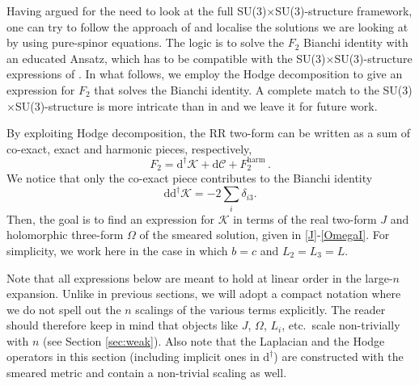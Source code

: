 \documentclass[11pt]{article}
\newcommand{\be}{\begin{equation}}
\newcommand{\ee}{\end{equation}}
\def\be{\begin{equation}}
\def\ee{\end{equation}}
\renewcommand{\[}{\left[}
\renewcommand{\]}{\right]}
\renewcommand{\(}{\left(}
\renewcommand{\)}{\right)}
\renewcommand{\d}{\textrm{d}}
\newcommand{\dd}{\mathrm{d}}
\newcommand{\<}{\langle}
\renewcommand{\>}{\rangle}
\begin{document}
Having argued for the need to look at the full SU(3)$\times$SU(3)-structure framework, one can try to follow the approach of \cite{Marchesano:2020qvg} and localise the solutions we are looking at by using pure-spinor equations. The logic is to solve the $F_2$ Bianchi identity with an educated Ansatz, which has to be compatible with the SU(3)$\times$SU(3)-structure expressions of \cite{Saracco:2012wc}. In what follows, we employ the Hodge decomposition to give an expression for $F_2$ that solves the Bianchi identity. A complete match to the SU(3)$\times$SU(3)-structure is more intricate than in \cite{Marchesano:2020qvg} and we leave it for future work.

By exploiting Hodge decomposition, the RR two-form can be written as a sum of co-exact, exact and harmonic pieces, respectively,
\be
\label{eq:F2HodgeDecomposition}
	F_2 = \dd^\dagger \mathcal{K} + \dd \mathcal{C} + F_2^\text{harm}\,.
\ee
We notice that only the co-exact piece contributes to the Bianchi identity 
\be
   \dd \dd^\dagger \mathcal{K} =-2 \sum_i \delta_{i3}.
\ee
Then, the goal is to find an expression for $\mathcal{K}$ in terms of the real two-form $J$ and holomorphic three-form $\Omega$ of the smeared solution, given in \eqref{J}-\eqref{OmegaI}. For simplicity, we work here in the case in which $b = c$ and $L_2 = L_3 = L$. 

Note that all expressions below are meant to hold at linear order in the large-$n$ expansion. Unlike in previous sections, we will adopt a compact notation where we do not spell out the $n$ scalings of the various terms explicitly. The reader should therefore keep in mind that objects like $J$, $\Omega$, $L_i$, etc.~scale non-trivially with $n$ (see Section \ref{sec:weak}). Also note that the Laplacian and the Hodge operators in this section (including implicit ones in $\d^\dagger$) are constructed with the smeared metric and contain a non-trivial scaling as well.
\end{document}
